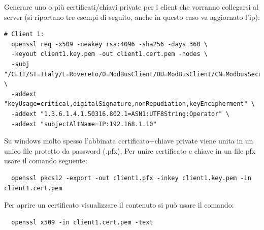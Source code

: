 Generare uno o più certificati/chiavi private per i client che 
vorranno collegarsi al server (si riportano tre esempi di seguito, anche in questo caso va aggiornato l'ip):

\begin{verbatim}
# Client 1:
  openssl req -x509 -newkey rsa:4096 -sha256 -days 360 \
  -keyout client1.key.pem -out client1.cert.pem -nodes \
  -subj "/C=IT/ST=Italy/L=Rovereto/O=ModBusClient/OU=ModBusClient/CN=ModbusSecurityClient" \
  -addext "keyUsage=critical,digitalSignature,nonRepudiation,keyEncipherment" \
  -addext "1.3.6.1.4.1.50316.802.1=ASN1:UTF8String:Operator" \
  -addext "subjectAltName=IP:192.168.1.10"
\end{verbatim}

Su windows molto spesso l'abbinata certificato+chiave private viene unita in un unico file protetto da password (.pfx),
Per unire certificato e chiave in un file pfx usare il comando seguente:

\begin{verbatim}
  openssl pkcs12 -export -out client1.pfx -inkey client1.key.pem -in client1.cert.pem
\end{verbatim}

Per aprire un certificato visualizzare il contenuto si può usare il comando:

\begin{verbatim}
  openssl x509 -in client1.cert.pem -text
\end{verbatim}
